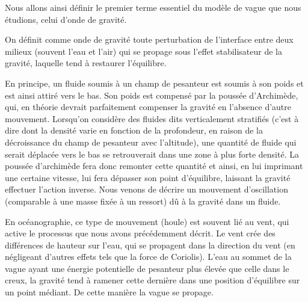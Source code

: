 


Nous allons ainsi définir le premier terme essentiel du modèle de vague que nous étudions, celui d'onde de gravité.

\begin{definition}
\begin{definitionbox}
    On définit comme onde de gravité toute perturbation de l'interface entre deux milieux (souvent l'eau et l'air) qui se propage sous l'effet stabilisateur de la gravité, laquelle tend à restaurer l'équilibre.
\end{definitionbox}
\end{definition}

En principe, un fluide soumis à un champ de pesanteur est soumis à son poids et est ainsi attiré vers le bas. Son poids est compensé par la poussée d'Archimède, qui, en théorie devrait parfaitement compenser la gravité en l'absence d'autre mouvement. Lorsqu'on considère des fluides dits verticalement stratifiés (c'est à dire dont la densité varie en fonction de la profondeur, en raison de la décroissance du champ de pesanteur avec l'altitude), une quantité de fluide qui serait déplacée vers le bas se retrouverait dans une zone à plus forte densité. La poussée d'archimède fera donc remonter cette quantité et ainsi, en lui imprimant une certaine vitesse, lui fera dépasser son point d'équilibre, laissant la gravité effectuer l'action inverse.
Nous venons de décrire un mouvement d'oscillation (comparable à une masse fixée à un ressort) dû à la gravité dans un fluide.

En océanographie, ce type de mouvement (houle) est souvent lié au vent, qui active le processus que nous avons précédemment décrit. Le vent crée des différences de hauteur sur l'eau, qui se propagent dans la direction du vent (en négligeant d'autres effets tels que la force de Coriolis). L'eau au sommet de la vague ayant une énergie potentielle de pesanteur plus élevée que celle dans le creux, la gravité tend à ramener cette dernière dans une position d'équilibre sur un point médiant. De cette manière la vague se propage. 

